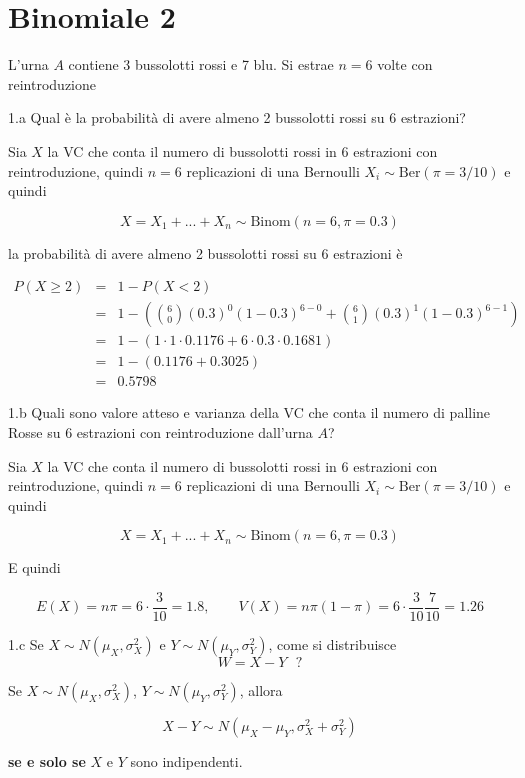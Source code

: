 \documentclass[
  11pt,
]{book}
\theoremstyle{mytheoremstyle}
\theoremstyle{mydefstyle}
\newenvironment{sol}
  {
  \begin{tcolorbox}[enhanced,breakable,arc=0.1mm,boxrule=1pt,colback=white,colframe=iblue,
  title=\bf \fontfamily{lmss}\selectfont \hspace{.5 cm} Soluzione,drop fuzzy shadow]

}{
\end{tcolorbox}
  }
\begin{document}
\section{Binomiale 2}\label{binomiale-2}

L'urna \(A\) contiene 3 bussolotti rossi e 7 blu. Si estrae \(n=6\) volte con reintroduzione

1.a Qual è la probabilità di avere almeno 2 bussolotti rossi su 6 estrazioni?

\begin{sol}
Sia \(X\) la VC che conta il numero di bussolotti rossi in 6 estrazioni con reintroduzione,
quindi \(n=6\) replicazioni di una Bernoulli \(X_i\sim\mbox{Ber}(\pi=3/10)\) e quindi

\[
X=X_1+...+X_n\sim\mbox{Binom}(n=6,\pi=0.3)
\]

la probabilità di avere almeno 2 bussolotti rossi su 6 estrazioni è

\begin{eqnarray*}
P(X\ge 2)&=& 1- P(X<2)\\
&=&1-\left(\binom{6}{0}\left(0.3\right)^0 \left(1-0.3\right)^{6-0}+\binom{6}{1}\left(0.3\right)^1 \left(1-0.3\right)^{6-1}\right)\\
&=&1-\left(1\cdot 1 \cdot 0.1176+6\cdot0.3\cdot 0.1681\right)\\
&=&1-(0.1176+0.3025)\\
&=&0.5798
\end{eqnarray*}

\end{sol}

1.b Quali sono valore atteso e varianza della VC che conta il numero di palline Rosse su 6 estrazioni con reintroduzione dall'urna \(A\)?

\begin{sol}
Sia \(X\) la VC che conta il numero di bussolotti rossi in 6 estrazioni con reintroduzione,
quindi \(n=6\) replicazioni di una Bernoulli \(X_i\sim\mbox{Ber}(\pi=3/10)\) e quindi

\[
X=X_1+...+X_n\sim\mbox{Binom}(n=6,\pi=0.3)
\]

E quindi

\[E(X)=n\pi=6\cdot\frac 3{10}=1.8,\qquad V(X)=n\pi(1-\pi)=6\cdot\frac 3{10}\frac 7{10}=1.26\]

\end{sol}

1.c Se \(X\sim N(\mu_X,\sigma_X^2)\) e \(Y\sim N(\mu_Y,\sigma_Y^2)\), come si distribuisce
\[W=X-Y ~~~?\]

\begin{sol}
Se \(X\sim N(\mu_X,\sigma_X^2)\), \(Y\sim N(\mu_Y,\sigma_Y^2)\), allora

\[X-Y\sim N(\mu_X-\mu_Y,\sigma_X^2+\sigma_Y^2)\]

\textbf{se e solo se} \(X\) e \(Y\) sono indipendenti.

\end{sol}
\end{document}
